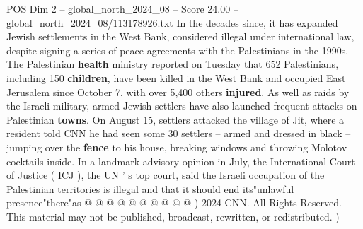 \begin{textsample}{POS Dim 2 – global\_north\_2024\_08 – Score 24.00 – global\_north\_2024\_08/113178926.txt}
In the decades since, it has expanded Jewish settlements in the West Bank, considered illegal under international law, despite signing a series of peace agreements with the Palestinians in the 1990s.
The Palestinian \textbf{health} ministry reported on Tuesday that 652 Palestinians, including 150 \textbf{children}, have been killed in the West Bank and occupied East Jerusalem since October 7, with over 5,400 others \textbf{injured}.
As well as raids by the Israeli military, armed Jewish settlers have also launched frequent attacks on Palestinian \textbf{towns}.
On August 15, settlers attacked the village of Jit, where a resident told CNN he had seen some 30 settlers -- armed and dressed in black -- jumping over the \textbf{fence} to his house, breaking windows and throwing Molotov cocktails inside.
In a landmark advisory opinion in July, the International Court of Justice ( ICJ ), the UN ' s top court, said the Israeli occupation of the Palestinian territories is illegal and that it should end its"unlawful presence"there"as @ @ @ @ @ @ @ @ @ @ ) 2024 CNN.
All Rights Reserved.
This material may not be published, broadcast, rewritten, or redistributed. )

\end{textsample}
